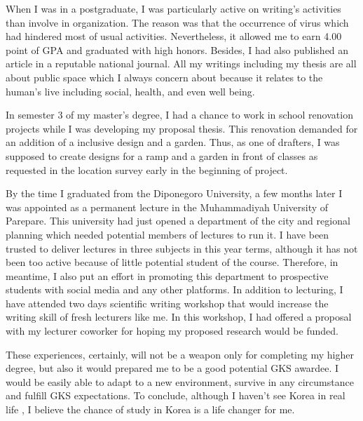 \documentclass[11pt]{simart} %
\begin{document}
When I was in a postgraduate, I was particularly active on writing's activities than involve in organization. The reason was that the occurrence of virus which had hindered most of usual activities. Nevertheless, it allowed me to earn 4.00 point of GPA and graduated with high honors. Besides, I had also published an article in a reputable national journal. All my writings including my thesis are all about public space which I always concern about because it relates to the human's live including social, health, and even well being.

In semester 3 of my master's degree, I had a chance to work in school renovation projects while I was developing my proposal thesis. This renovation demanded for an addition of a inclusive design and a garden. Thus, as one of drafters, I was supposed to create designs for a ramp and a garden in front of classes as requested in the location survey early in the beginning of project. %

By the time I graduated from the Diponegoro University, a few months later I was appointed as a permanent lecture in the Muhammadiyah University of Parepare.
This university had just opened a department of the city and regional planning which needed potential members of lectures to run it.
I have been trusted to deliver lectures in three subjects in this year terms, although it has not been too active because of little potential student of the course.
Therefore, in meantime, I also put an effort in promoting this department to prospective students with social media and any other platforms.
In addition to lecturing, I have attended two days scientific writing workshop that would increase the writing skill of fresh lecturers like me. In this workshop, I had offered a proposal with my lecturer coworker for hoping my proposed research would be funded.

These experiences, certainly, will not be a weapon only for completing my higher degree, but also it would prepared me to be a good potential GKS awardee. I would be easily able to adapt to a new environment, survive in any circumstance and fulfill GKS expectations. To conclude, although I haven't see Korea in real life , I believe the chance of study in Korea is a life changer for me.
















%

%
\end{document}
